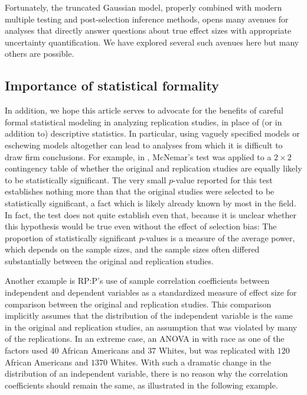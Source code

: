 \documentclass[11pt]{article}
\theoremstyle{definition}
\theoremstyle{custom}
\begin{document}
  Fortunately, the truncated Gaussian model, properly combined with modern multiple testing and post-selection inference methods, opens many avenues for analyses that directly answer questions about true effect sizes with appropriate uncertainty quantification. We have explored several such avenues here \citep[see also][]{Andrews:2018vh} but many others are possible.

\subsection{Importance of statistical formality}

  In addition, we hope this article serves to advocate for the benefits of careful formal statistical modeling in analyzing replication studies, in place of (or in addition to) descriptive statistics. In particular, using vaguely specified models or eschewing models altogether can lead to analyses from which it is difficult to draw firm conclusions. For example, in \citet{OpenScienceCollaboration:2015cn}, McNemar's test was applied to a $2 \times 2$ contingency table of whether the original and replication studies are equally likely to be statistically significant. The very small $p$-value reported for this test establishes nothing more than that the original studies were selected to be statistically significant, a fact which is likely already known by most in the field. In fact, the test does not quite establish even that, because it is unclear whether this hypothesis would be true even without the effect of selection bias: The proportion of statistically significant $p$-values is a measure of the average power, which depends on the sample sizes, and the sample sizes often differed substantially between the original and replication studies.

  Another example is RP:P's use of sample correlation coefficients between independent and dependent variables as a standardized measure of effect size for comparison between the original and replication studies. This comparison implicitly assumes that the distribution of the independent variable is the same in the original and replication studies, an assumption that was violated by many of the replications. In an extreme case, an ANOVA in \citet{PurdieVaughns:2008en} with race as one of the factors used $40$ African Americans and $37$ Whites, but was replicated with $120$ African Americans and $1370$ Whites. With such a dramatic change in the distribution of an independent variable, there is no reason why the correlation coefficients should remain the same, as illustrated in the following example.
\end{document}
